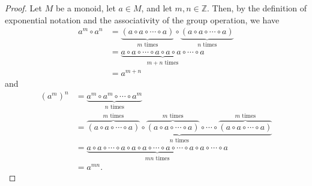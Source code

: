 \documentclass[10pt, titlepage]{amsart}
\newcommand\Z{{\mathbb Z}}
\theoremstyle{definition}
\begin{document}
	\begin{proof}
		Let $M$ be a monoid, let $a \in M$, and let $m,n \in \Z$.
		Then, by the definition of exponential notation and the associativity of the group operation, we have 
		\begin{align*}
		a^m \circ a^n &= \underbrace{(a \circ a \circ \cdots \circ a)}_{m \text{ times}} \circ \underbrace{(a \circ a \circ \cdots \circ a)}_{n \text{ times}} \\
		&= \underbrace{a \circ a \circ \cdots \circ a \circ a \circ a \circ \cdots \circ a}_{m + n \text{ times}} \\
		&= a^{m + n} 
		\end{align*}
		and 
		\begin{align*}
		(a^m)^n &= \underbrace{a^m \circ a^m \circ \cdots \circ a^m}_{n \text{ times}} \\
		&= \underbrace{\overbrace{(a \circ a \circ \cdots \circ a)}^{m \text{ times}} \circ \overbrace{(a \circ a \circ \cdots \circ a)}^{m \text{ times}} \circ \cdots \circ \overbrace{(a \circ a \circ \cdots \circ a)}^{m \text{ times}}}_{n \text{ times}} \\
		&= \underbrace{a \circ a \circ \cdots \circ a \circ a \circ a \circ \cdots \circ a \circ \cdots \circ a \circ a \circ \cdots \circ a}_{mn \text{ times}} \\
		&= a^{mn}.
		\end{align*}
		
	\end{proof}
	
\end{document}
